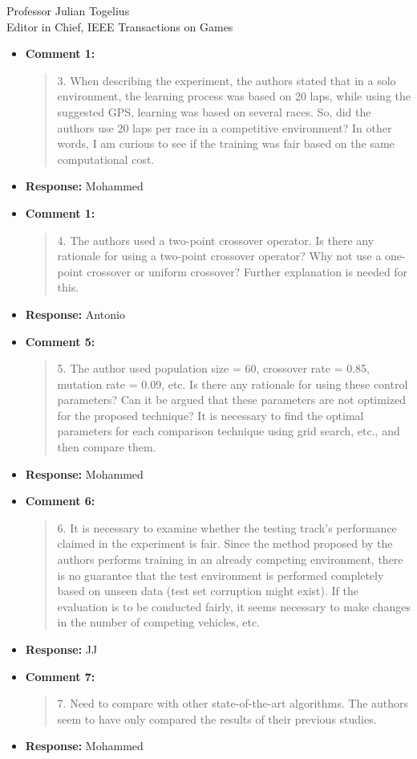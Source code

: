 \documentclass[10pt]{letter} %
\begin{document}
\begin{letter}{Professor Julian Togelius \\ Editor in Chief, IEEE Transactions on Games}
\begin{enumerate}
\begin{itemize}
		
		\item {\bf Comment 1:}
		\begin{quote}
3. When describing the experiment, the authors stated that in a solo environment, the learning process was based on 20 laps, while using the suggested GPS, learning was based on several races. So, did the authors use 20 laps per race in a competitive environment? In other words, I am curious to see if the training was fair based on the same computational cost.
			\end{quote}	
		\item {\bf Response:} 
		Mohammed
		\item {\bf Comment 1:}
		\begin{quote}
4. The authors used a two-point crossover operator. Is there any rationale for using a two-point crossover operator? Why not use a one-point crossover or uniform crossover? Further explanation is needed for this.
			\end{quote}	
		\item {\bf Response:} 
		Antonio
		\item {\bf Comment 5:}
		\begin{quote}
5. The author used population size = 60, crossover rate = 0.85, mutation rate = 0.09, etc. Is there any rationale for using these control parameters? Can it be argued that these parameters are not optimized for the proposed technique? It is necessary to find the optimal parameters for each comparison technique using grid search, etc., and then compare them.
			\end{quote}	
		\item {\bf Response:} 
		Mohammed
		\item {\bf Comment 6:}
		\begin{quote}
6. It is necessary to examine whether the testing track's performance claimed in the experiment is fair. Since the method proposed by the authors performs training in an already competing environment, there is no guarantee that the test environment is performed completely based on unseen data (test set corruption might exist). If the evaluation is to be conducted fairly, it seems necessary to make changes in the number of competing vehicles, etc.
			\end{quote}	
		\item {\bf Response:} 
		JJ
		\item {\bf Comment 7:}
		\begin{quote}
7. Need to compare with other state-of-the-art algorithms. The authors seem to have only compared the results of their previous studies.				
			\end{quote}	
		\item {\bf Response:} 
		Mohammed		
	\end{itemize}					


\end{enumerate}
\end{letter}
\end{document}
